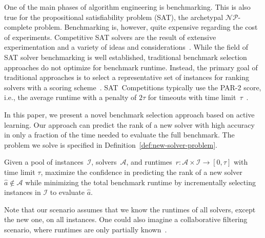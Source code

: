 \documentclass[runningheads]{llncs}
\begin{document}
One of the main phases of algorithm engineering is benchmarking.
This is also true for the propositional satisfiability problem (SAT), the archetypal $\mathcal{NP}$-complete problem.
Benchmarking is, however, quite expensive regarding the cost of experiments.
Competitive SAT solvers are the result of extensive experimentation and a variety of ideas and considerations~\cite{FroleyksHIJS21,sat2022}.
While the field of SAT solver benchmarking is well established, traditional benchmark selection approaches do not optimize for benchmark runtime.
Instead, the primary goal of traditional approaches is to select a representative set of instances for ranking solvers with a scoring scheme~\cite{Gelder11,HoosKSS13}.
SAT~Competitions typically use the PAR-2 score, i.e., the average runtime with a penalty of $2 \tau$ for timeouts with time limit~$\tau$~\cite{FroleyksHIJS21}.

In this paper, we present a novel benchmark selection approach based on active learning.
Our approach can predict the rank of a new solver with high accuracy in only a fraction of the time needed to evaluate the full benchmark.
The problem we solve is specified in Definition~\ref{def:new-solver-problem}.

\begin{definition}
  Given a pool of instances~$\mathcal{I}$, solvers~$\mathcal{A}$, and runtimes~$r\!: \mathcal{A} \times \mathcal{I} \rightarrow \left[0, \tau\right]$ with time limit $\tau$, maximize the confidence in predicting the rank of a new solver $\hat{a} \notin \mathcal{A}$ while minimizing the total benchmark runtime by incrementally selecting instances in $\mathcal{I}$ to evaluate $\hat{a}$.
  \label{def:new-solver-problem}
\end{definition}

Note that our scenario assumes that we know the runtimes of all solvers, except the new one, on all instances.
One could also imagine a collaborative filtering scenario, where runtimes are only partially known~\cite{misir2017data,misir2017alors}.
\end{document}
